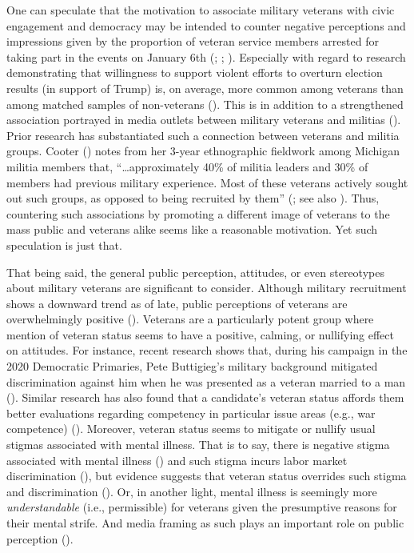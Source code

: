 \documentclass[
  12pt,
  letterpaper,
]{article}
\begin{document}
One can speculate that the motivation to associate military veterans
with civic engagement and democracy may be intended to counter negative
perceptions and impressions given by the proportion of veteran service
members arrested for taking part in the events on January 6th
(;
;
). Especially with
regard to research demonstrating that willingness to support violent
efforts to overturn election results (in support of Trump) is, on
average, more common among veterans than among matched samples of
non-veterans (). This is in
addition to a strengthened association portrayed in media outlets
between military veterans and militias
(). Prior research has
substantiated such a connection between veterans and militia groups.
Cooter () notes from her 3-year
ethnographic fieldwork among Michigan militia members that,
``\ldots approximately 40\% of militia leaders and 30\% of members had
previous military experience. Most of these veterans actively sought out
such groups, as opposed to being recruited by them''
(; see also
). Thus, countering such
associations by promoting a different image of veterans to the mass
public and veterans alike seems like a reasonable motivation. Yet such
speculation is just that.

That being said, the general public perception, attitudes, or even
stereotypes about military veterans are significant to consider.
Although military recruitment shows a downward trend as of late, public
perceptions of veterans are overwhelmingly positive
().
Veterans are a particularly potent group where mention of veteran status
seems to have a positive, calming, or nullifying effect on attitudes.
For instance, recent research shows that, during his campaign in the
2020 Democratic Primaries, Pete Buttigieg's military background
mitigated discrimination against him when he was presented as a veteran
married to a man ().
Similar research has also found that a candidate's veteran status
affords them better evaluations regarding competency in particular issue
areas (e.g., war competence) (). Moreover, veteran status seems to mitigate or nullify usual
stigmas associated with mental illness. That is to say, there is
negative stigma associated with mental illness
() and such stigma
incurs labor market discrimination (), but evidence suggests that veteran status overrides such
stigma and discrimination (). Or, in another light, mental illness is seemingly more
\emph{understandable} (i.e., permissible) for veterans given the
presumptive reasons for their mental strife. And media framing as such
plays an important role on public perception
().
\end{document}
